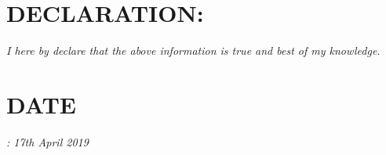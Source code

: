 \documentclass[margin]{res}
\begin{document}
\begin{resume}
\section{DECLARATION: } 
{\sl I here by declare that the above information is true and best of my knowledge.}

 \section{DATE}
 {\sl : 17th April 2019}

\end{resume}
\end{document}

